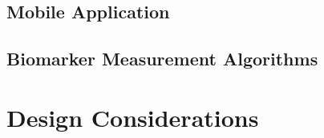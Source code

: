 
\subsection{Mobile Application}



\subsection{Biomarker Measurement Algorithms}



\section{Design Considerations}



